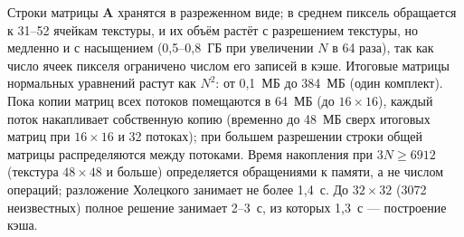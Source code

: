 \begin{table}[htbp]
    \centering
    \small
    \setlength{\tabcolsep}{3.5pt}
    \caption{Метод наименьших квадратов на кэше световых путей: память и время в зависимости от числа неизвестных, изображение $1024\times1024$, 32 потока. <<Процесс>> --- максимальный объём занятой памяти, включая сцену и кэш (около 1,9~ГБ); <<Всего>> --- время от загрузки сцены до решения, включая построение кэша (1,3~с). Ошибка $\eta$ --- средняя относительная ошибка по ячейкам.}
    \label{tab:lsq-scaling}
\end{table}

Строки матрицы $\mathbf{A}$ хранятся в разреженном виде; в среднем пиксель обращается к 31--52 ячейкам текстуры, и их объём растёт с разрешением текстуры, но медленно и с насыщением (0,5--0,8~ГБ при увеличении $N$ в 64 раза), так как число ячеек пикселя ограничено числом его записей в кэше. Итоговые матрицы нормальных уравнений растут как $N^2$: от 0,1~МБ до 384~МБ (один комплект). Пока копии матриц всех потоков помещаются в 64~МБ (до $16\times16$), каждый поток накапливает собственную копию (временно до 48~МБ сверх итоговых матриц при $16\times16$ и 32 потоках); при большем разрешении строки общей матрицы распределяются между потоками. Время накопления при $3N\geq 6912$ (текстура $48\times48$ и больше) определяется обращениями к памяти, а не числом операций; разложение Холецкого занимает не более 1,4~с. До $32\times32$ (3072 неизвестных) полное решение занимает 2--3~с, из которых 1,3~с --- построение кэша.

